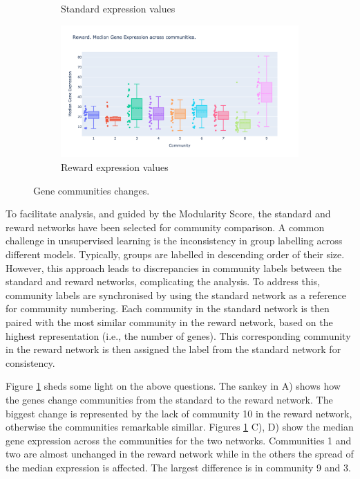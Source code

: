 \begin{figure}[!htb]
\begin{subfigure}[b]{0.47\textwidth}
        \caption{Standard expression values}
    \end{subfigure}
    \hfill
    \begin{subfigure}[b]{0.47\textwidth}
        \centering
        \includegraphics[width=\textwidth,keepaspectratio]{Sections/Network_I/Resources/P0/Comms/P0_norm3_4K_50TF_med.png}
        \caption{Reward expression values}
    \end{subfigure}
    \hfill
    \caption{Gene communities changes.}
    \label{fig:N_I:p0_comm_chgs}
\end{figure}


To facilitate analysis, and guided by the Modularity Score, the standard and reward networks have been selected for community comparison. A common challenge in unsupervised learning is the inconsistency in group labelling across different models. Typically, groups are labelled in descending order of their size. However, this approach leads to discrepancies in community labels between the standard and reward networks, complicating the analysis. To address this, community labels are synchronised by using the standard network as a reference for community numbering. Each community in the standard network is then paired with the most similar community in the reward network, based on the highest representation (i.e., the number of genes). This corresponding community in the reward network is then assigned the label from the standard network for consistency.

Figure \ref{fig:N_I:p0_comm_chgs} sheds some light on the above questions. The sankey in A) shows 
how the genes change communities from the standard to the reward network. The biggest change is represented by the lack of community 10 in the reward network, otherwise the communities remarkable simillar. Figures \ref{fig:N_I:p0_comm_chgs} C), D) show the median gene expression across the communities for the two networks. Communities 1 and two are almost unchanged in the reward network while in the others the spread of the median expression is affected. The largest difference is in community 9 and 3.  

